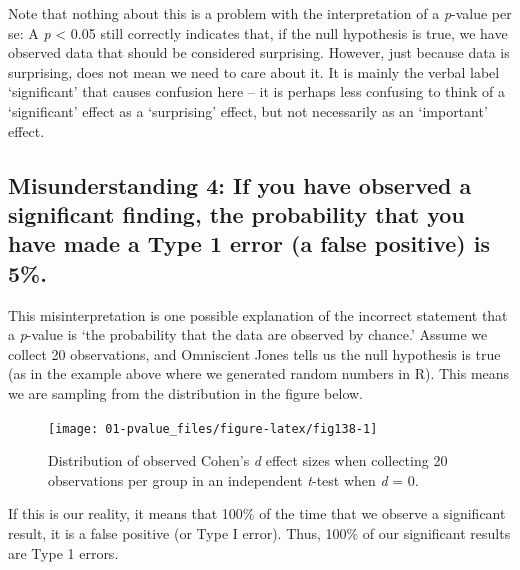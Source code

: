 \documentclass[
  oneside]{book}
\begin{document}
Note that nothing about this is a problem with the interpretation of a \emph{p}-value per se: A \emph{p} \textless{} 0.05 still correctly indicates that, if the null hypothesis is true, we have observed data that should be considered surprising. However, just because data is surprising, does not mean we need to care about it. It is mainly the verbal label `significant' that causes confusion here -- it is perhaps less confusing to think of a `significant' effect as a `surprising' effect, but not necessarily as an `important' effect.

\hypertarget{misconception4}{%
\subsection{Misunderstanding 4: If you have observed a significant finding, the probability that you have made a Type 1 error (a false positive) is 5\%.}\label{misconception4}}

This misinterpretation is one possible explanation of the incorrect statement that a \emph{p}-value is `the probability that the data are observed by chance.' Assume we collect 20 observations, and Omniscient Jones tells us the null hypothesis is true (as in the example above where we generated random numbers in R). This means we are sampling from the distribution in the figure below.



\begin{figure}

{\centering \texttt{[image: 01-pvalue\_files/figure-latex/fig138-1]} 

}

\caption{Distribution of observed Cohen's \emph{d} effect sizes when collecting 20 observations per group in an independent \emph{t}-test when \emph{d} = 0.}\label{fig:fig138}
\end{figure}

If this is our reality, it means that 100\% of the time that we observe a significant result, it is a false positive (or Type I error). Thus, 100\% of our significant results are Type 1 errors.
\end{document}
